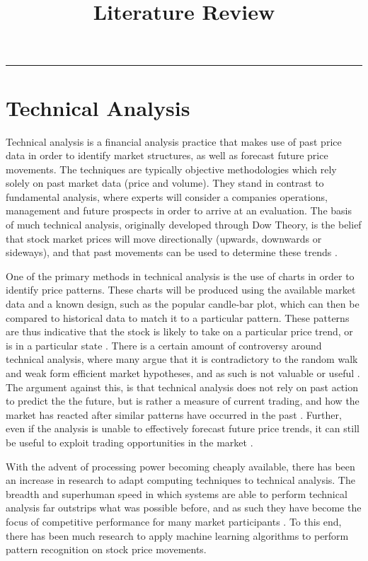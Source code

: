 \documentclass[a4paper,latin]{paper}
\title{Literature Review}
\begin{document}
 
\maketitle  
\hrule

\section{Technical Analysis}\label{TechnicalAnalysis}

Technical analysis is a financial analysis practice that makes use of past price data in order to identify market 
structures, as well as forecast future price movements. The techniques are typically objective methodologies 
which rely solely on past market data (price and volume). They stand in contrast to fundamental analysis, where 
experts will consider a companies operations, management and future prospects in order to arrive at an evaluation. 
The basis of much technical analysis, originally developed through Dow Theory, is the belief that stock market 
prices will move directionally (upwards, downwards or sideways), and that past movements can be used to 
determine these trends  \cite {Murphy}.
\hfill \break 

One of the primary methods in technical analysis is the use of charts in order to identify price patterns. 
These charts will be produced using the available market data and a known design, such as the popular candle-bar 
plot, which can then be compared to historical data to match it to a particular pattern. These patterns are thus 
indicative that the stock is likely to take on a particular price trend, or is in a particular state \cite {Murphy}.  
There is a certain amount of controversy around technical analysis, where many argue that it is contradictory 
to the random walk and weak form efficient market hypotheses, and as such is not valuable or useful \cite {Griffioen}. 
The argument against this, is that technical analysis does not rely on past action to predict the the future, but is 
rather a measure of current trading, and how the market has reacted after similar patterns have occurred in the 
past \cite {Kahn}. Further, even if the analysis is unable to effectively forecast future price trends, it can still be useful 
to exploit trading opportunities in the market \cite{Schwager}.
\hfill \break 

With the advent of processing power becoming cheaply available, there has been an increase in research to 
adapt computing techniques to technical analysis. The breadth and superhuman speed in which systems are 
able to perform technical analysis far outstrips what was possible before, and as such they have become the 
focus of competitive performance for many market participants \cite {Johnson}. To this end, there has been much 
research to apply machine learning algorithms to perform pattern recognition on stock price movements.
\hfill \break
\end{document}
